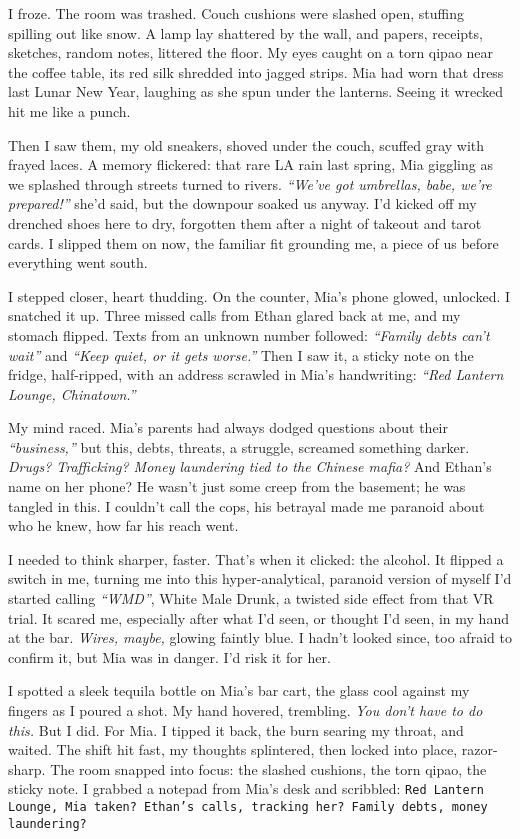 \documentclass[12pt,oneside]{book} %
\newcommand{\note}[1]{\texttt{#1}}
\begin{document}
I froze. The room was trashed. Couch cushions were slashed open, stuffing spilling out like snow. A lamp lay shattered by the wall, and papers, receipts, sketches, random notes, littered the floor. My eyes caught on a torn qipao near the coffee table, its red silk shredded into jagged strips. Mia had worn that dress last Lunar New Year, laughing as she spun under the lanterns. Seeing it wrecked hit me like a punch.

Then I saw them, my old sneakers, shoved under the couch, scuffed gray with frayed laces. A memory flickered: that rare LA rain last spring, Mia giggling as we splashed through streets turned to rivers. \textit{“We’ve got umbrellas, babe, we’re prepared!”} she’d said, but the downpour soaked us anyway. I’d kicked off my drenched shoes here to dry, forgotten them after a night of takeout and tarot cards. I slipped them on now, the familiar fit grounding me, a piece of us before everything went south.

I stepped closer, heart thudding. On the counter, Mia’s phone glowed, unlocked. I snatched it up. Three missed calls from Ethan glared back at me, and my stomach flipped. Texts from an unknown number followed: \textit{“Family debts can’t wait”} and \textit{“Keep quiet, or it gets worse.”} Then I saw it, a sticky note on the fridge, half-ripped, with an address scrawled in Mia’s handwriting: \textit{“Red Lantern Lounge, Chinatown.”}

My mind raced. Mia’s parents had always dodged questions about their \textit{“business,”} but this, debts, threats, a struggle, screamed something darker. \textit{Drugs? Trafficking? Money laundering tied to the Chinese mafia?} And Ethan’s name on her phone? He wasn’t just some creep from the basement; he was tangled in this. I couldn’t call the cops, his betrayal made me paranoid about who he knew, how far his reach went.

I needed to think sharper, faster. That’s when it clicked: the alcohol. It flipped a switch in me, turning me into this hyper-analytical, paranoid version of myself I’d started calling \textit{“WMD”}, White Male Drunk, a twisted side effect from that VR trial. It scared me, especially after what I’d seen, or thought I’d seen, in my hand at the bar. \textit{Wires, maybe,} glowing faintly blue. I hadn’t looked since, too afraid to confirm it, but Mia was in danger. I’d risk it for her.

I spotted a sleek tequila bottle on Mia’s bar cart, the glass cool against my fingers as I poured a shot. My hand hovered, trembling. \textit{You don’t have to do this.} But I did. For Mia. I tipped it back, the burn searing my throat, and waited. The shift hit fast, my thoughts splintered, then locked into place, razor-sharp. The room snapped into focus: the slashed cushions, the torn qipao, the sticky note. I grabbed a notepad from Mia’s desk and scribbled: \note{Red Lantern Lounge, Mia taken? Ethan’s calls, tracking her? Family debts, money laundering?}
\end{document}
